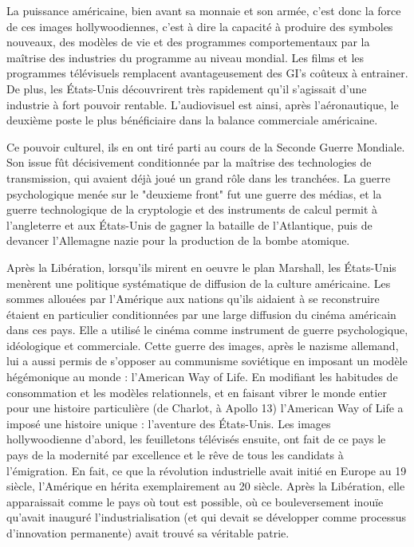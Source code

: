 \documentclass[a4paper,14pt]{extreport}
\begin{document}
La puissance américaine, bien avant sa monnaie et son armée, c'est donc la force de ces images hollywoodiennes, c'est à dire la capacité à produire des symboles nouveaux, des modèles de vie et des programmes comportementaux par la maîtrise des industries du programme au niveau mondial. Les films et les programmes télévisuels remplacent avantageusement des GI's coûteux à entrainer. De plus, les États-Unis découvrirent très rapidement qu’il s’agissait d’une industrie à fort pouvoir rentable. L'audiovisuel est ainsi, après l'aéronautique, le deuxième poste le plus bénéficiaire dans la balance commerciale américaine.

Ce pouvoir culturel, ils en ont tiré parti au cours de la Seconde Guerre Mondiale. Son issue fût décisivement conditionnée par la maîtrise des technologies de transmission, qui avaient déjà joué un grand rôle dans les tranchées. La guerre psychologique menée sur le "deuxieme front" fut une guerre des médias, et la guerre technologique de la cryptologie et des instruments de calcul permit à l'angleterre et aux États-Unis de gagner la bataille de l'Atlantique, puis de devancer l'Allemagne nazie pour la production de la bombe atomique.

Après la Libération, lorsqu'ils mirent en oeuvre le plan Marshall, les États-Unis menèrent une politique systématique de diffusion de la culture américaine. Les sommes allouées par l'Amérique aux nations qu'ils aidaient à se reconstruire étaient en particulier conditionnées par une large diffusion du cinéma américain dans ces pays. Elle a utilisé le cinéma comme instrument de guerre psychologique, idéologique et commerciale. Cette guerre des images, après le nazisme allemand, lui a aussi permis de s'opposer au communisme soviétique en imposant un modèle hégémonique au monde :  l'American Way of Life. En modifiant les habitudes de consommation et les modèles relationnels, et en faisant vibrer le monde entier pour une histoire particulière (de Charlot, à Apollo 13) l'American Way of Life a imposé une histoire unique : l'aventure des États-Unis. Les images hollywoodienne d'abord, les feuilletons télévisés ensuite, ont fait de ce pays le pays de la modernité par excellence et le rêve de tous les candidats à l'émigration. En fait, ce que la révolution industrielle avait initié en Europe au 19 siècle, l'Amérique en hérita exemplairement au 20 siècle.  Après la Libération, elle  apparaissait comme le pays où tout est possible, où ce bouleversement inouïe qu'avait inauguré l'industrialisation (et qui devait se développer comme processus d'innovation permanente) avait trouvé sa véritable patrie.
\end{document}

